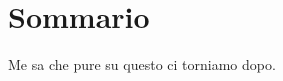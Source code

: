 
\chapter{Sommario}
\vspace{10pt}
\renewcommand{\baselinestretch}{1.5}
\fontsize{14}{14}\selectfont
Me sa che pure su questo ci torniamo dopo.
\clearpage